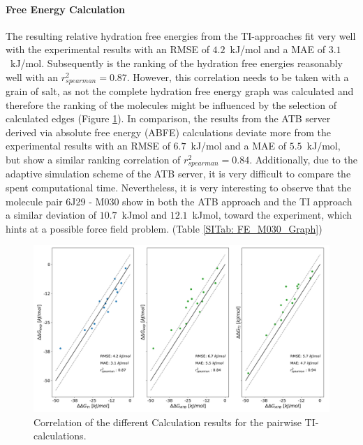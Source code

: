 \paragraph{Free Energy Calculation}
The resulting relative hydration free energies from the TI-approaches fit very well with the experimental results \cite{Martin2018} with an RMSE of $4.2$~kJ/mol and a MAE of $3.1$~kJ/mol. Subsequently is the ranking of the hydration free energies reasonably well with an $r^2_{spearman} = 0.87$. However, this correlation needs to be taken with a grain of salt, as not the complete hydration free energy graph was calculated and therefore the ranking of the molecules might be influenced by the selection of calculated edges (Figure \ref{fig: pairCorr}). 
In comparison, the results from the ATB server derived via absolute free energy (ABFE) calculations deviate more from the experimental results with an RMSE of $6.7$~kJ/mol and a MAE of $5.5$~kJ/mol, but show a similar ranking correlation of $r^2_{spearman} = 0.84$.
Additionally, due to the adaptive simulation scheme of the ATB server, it is very difficult to compare the spent computational time. Nevertheless, it is very interesting to observe that the molecule pair 6J29 - M030 show in both the ATB approach and the TI approach a similar deviation of $10.7$~kJ\/mol and $12.1$~kJ\/mol, toward the experiment, which hints at a possible force field problem. (Table \ref{SITab: FE_M030_Graph})

\begin{figure}[h]
    \centering
    \includegraphics[width=\textwidth]{fig/results/pairwise/FE/M030_graph_ddG_solv_correlation_ATB_TI.png}
    \caption{Correlation of the different Calculation results for the pairwise TI-calculations.}
    \label{fig: pairCorr}
\end{figure}



